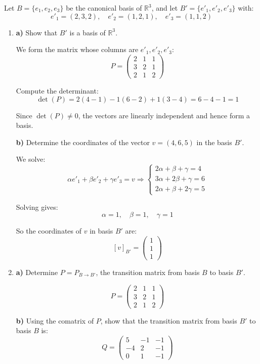 \documentclass[12pt]{article}
\begin{document}
\begin{answerbox}
Let $B = \{e_1, e_2, e_3\}$ be the canonical basis of $\mathbb{R}^3$, and let $B' = \{e'_1, e'_2, e'_3\}$ with:
$$
e'_1 = (2, 3, 2), \quad e'_2 = (1, 2, 1), \quad e'_3 = (1, 1, 2)
$$

\begin{enumerate}
\item \textbf{a)} Show that $B'$ is a basis of $\mathbb{R}^3$.

We form the matrix whose columns are $e'_1, e'_2, e'_3$:
$$
P = \begin{pmatrix}
2 & 1 & 1 \\
3 & 2 & 1 \\
2 & 1 & 2
\end{pmatrix}
$$

Compute the determinant:
$$
\det(P) = 2(4 - 1) - 1(6 - 2) + 1(3 - 4) = 6 - 4 - 1 = 1
$$

Since $\det(P) \ne 0$, the vectors are linearly independent and hence form a basis.

 \textbf{b)} Determine the coordinates of the vector $v = (4, 6, 5)$ in the basis $B'$.

We solve:
$$
\alpha e'_1 + \beta e'_2 + \gamma e'_3 = v
\Rightarrow 
\begin{cases}
2\alpha + \beta + \gamma = 4 \\
3\alpha + 2\beta + \gamma = 6 \\
2\alpha + \beta + 2\gamma = 5
\end{cases}
$$

Solving gives:
$$
\alpha = 1,\quad \beta = 1,\quad \gamma = 1
$$

So the coordinates of $v$ in basis $B'$ are:
$$
[v]_{B'} = \begin{pmatrix}1\\1\\1\end{pmatrix}
$$

\item \textbf{a)} Determine $P = P_{B \to B'}$, the transition matrix from basis $B$ to basis $B'$.

$$
P = \begin{pmatrix}
2 & 1 & 1 \\
3 & 2 & 1 \\
2 & 1 & 2
\end{pmatrix}
$$

\textbf{b)} Using the comatrix of $P$, show that the transition matrix from basis $B'$ to basis $B$ is:
$$
Q = \begin{pmatrix}
5 & -1 & -1 \\
-4 & 2 & -1 \\
0 & 1 & -1
\end{pmatrix}
$$


\end{enumerate}
\end{answerbox}
\end{document}
